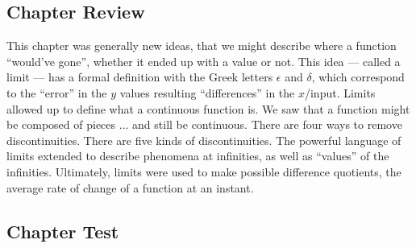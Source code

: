 \subsection{Chapter Review}
This chapter was generally new ideas, that we might describe where a function ``would've gone'',
whether it ended up with a value or not.  This idea --- called a limit --- has a formal definition with
the Greek letters $\epsilon$ and $\delta$, which correspond to the ``error'' in the $y$ values
resulting ``differences'' in the $x$/input.  Limits allowed up to define what a continuous 
function is.  We saw that a function might be composed of pieces ... and still be continuous.
There are four ways to remove discontinuities.  There are five kinds of discontinuities.
The powerful language of limits extended to describe phenomena at infinities, as well as ``values'' 
of the infinities.  Ultimately, limits were used to make possible difference quotients, the 
average rate of change of a function at an instant.

\subsection{Chapter Test}